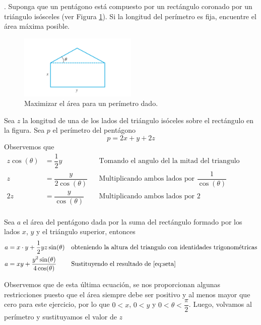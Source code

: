 \documentclass[letterpaper]{article}
\renewcommand{\*}{\cdot}
\theoremstyle{definition}
\begin{document}
. Suponga que un pentágono está compuesto por un rectángulo coronado por un triángulo isósceles (ver Figura \ref{fig:1}). Si la longitud del perímetro es fija, encuentre el área máxima posible.

\begin{figure}[h]
    \centering
    \includegraphics[width=0.5\textwidth]{img/figT}
    \caption{Maximizar el área para un perímetro dado.}
    \label{fig:1}
\end{figure}

Sea $ z $ la longitud de una de los lados del triángulo isóceles sobre el rectángulo en la figura. Sea $ p $ el perímetro del pentágono\[ p = 2x + y + 2z \]
Observemos que 
\begin{align*}
	z \cos(\theta) &= \dfrac{1}{2} y &&\text{Tomando el angulo del la mitad del triangulo iscóceles como referencia}\\
	z  &= \dfrac{y}{2\cos(\theta)} &&\text{Multiplicando ambos lados por } \dfrac{1}{\cos(\theta)} \label{eq:seta} \tag*{\jupiter}\\
	2z  &= \dfrac{y}{\cos(\theta)} &&\text{Multiplicando ambos lados por } 2 \label{eq:dosSeta}\tag*{\mars}\\
\end{align*}

Sea $ a $ el área del pentágono dada por  la suma del rectángulo formado por los lados $ x $, $ y $ y el triángulo superior, entonces 
\begin{align*}
	a &= x\* y + \dfrac{1}{2} yz \sin(\theta) && \text{obteniendo la altura del triangulo con identidades trigonométricas}\\
	a &= xy + \dfrac{y^2\sin(\theta)}{4\cos(\theta)} && \text{Sustituyendo el resultado de }\ref{eq:seta}\\
\end{align*}

Observemos que de esta última ecuación, se nos proporcionan algunas restricciones puesto que el área siempre debe ser positivo y al menos mayor que cero para este ejercicio, por lo que $ 0 < x $, $ 0 < y $ y $ 0 < \theta < \dfrac{\pi}{2} $. Luego, volvamos al perímetro y sustituyamos el valor de $ z $
\end{document}
